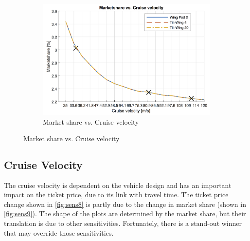 \begin{figure}[h]
\begin{subfigure}[t]{0.33\textwidth}
    \includegraphics[width=\textwidth]{Figures/cruise_marketshare.png}
    \captionsetup{justification=centering}
    \caption{Market share vs. Cruise velocity}
    \label{fig:sens9}
\end{subfigure}
\captionsetup{justification=centering}
\end{figure}

\subsection{Cruise Velocity}
The cruise velocity is dependent on the vehicle design and has an important impact on the ticket price, due to its link with travel time. The ticket price change shown in \autoref{fig:sens8} is partly due to the change in market share (shown in \autoref{fig:sens9}). The shape of the plots are determined by the market share, but their translation is due to other sensitivities. Fortunately, there is a stand-out winner that may override those sensitivities.


